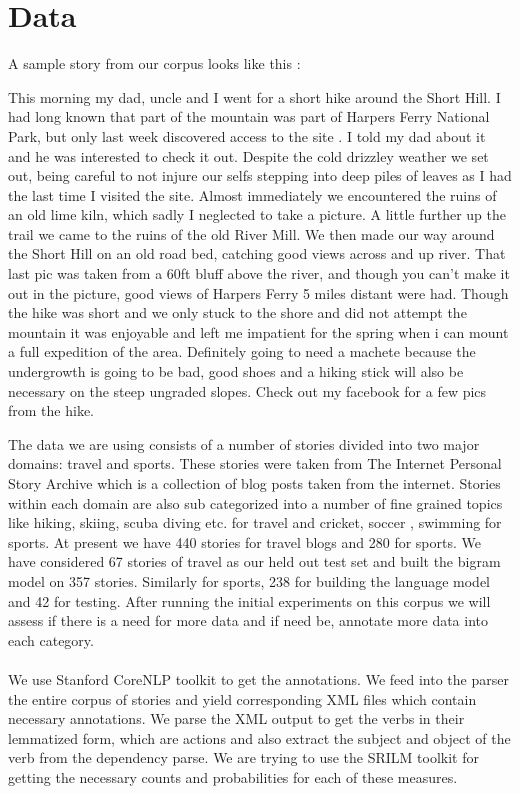 \documentclass[11pt]{article}
\begin{document}
\section{Data}
A sample story from our corpus looks like this :
\begin{mdframed}
\small This morning my dad, uncle and I went for a short hike around the Short Hill. I had long known that part of the mountain was part of Harpers Ferry National Park, but only last week discovered access to the site . I told my dad about it and he was interested to check it out. Despite the cold drizzley weather we set out, being careful to not injure our selfs stepping into deep piles of leaves as I had the last time I visited the site. Almost immediately we encountered the ruins of an old lime kiln, which sadly I neglected to take a picture. A little further up the trail we came to the ruins of the old River Mill. We then made our way around the Short Hill on an old road bed, catching good views across and up river. That last pic was taken from a 60ft bluff above the river, and though you can't make it out in the picture, good views of Harpers Ferry 5 miles distant were had. Though the hike was short and we only stuck to the shore and did not attempt the mountain it was enjoyable and left me impatient for the spring when i can mount a full expedition of the area. Definitely going to need a machete because the undergrowth is going to be bad, good shoes and a hiking stick will also be necessary on the steep ungraded slopes. Check out my facebook for a few pics from the hike. 
\end{mdframed} 
\vspace{2em}
The data we are using consists of a number of stories divided into two major domains: travel and sports. These stories were taken from The Internet Personal Story Archive\cite{ipsa} which is a collection of blog posts taken from the internet. Stories within each domain are also sub categorized into a number of fine grained topics like hiking, skiing, scuba diving etc. for travel and cricket, soccer , swimming for sports. At present we have 440 stories for travel blogs and 280 for sports. We have considered 67 stories of travel as our held out test set and built the bigram model on 357 stories. Similarly for sports, 238 for building the language model and 42 for testing. After running the initial experiments on this corpus we will assess if there is a need for more data and if need be, annotate more data into each category. \\
\smallskip \\
We use Stanford CoreNLP\cite{corenlp} toolkit to get the annotations. We feed into the parser the entire corpus of stories and yield corresponding XML files which contain necessary annotations. We parse the XML output to get the verbs in their lemmatized form, which are actions and also extract the subject and object of the verb from the dependency parse. We are trying to use the SRILM toolkit for getting the necessary counts and probabilities for each of these measures\cite{srilm}.
\end{document}
